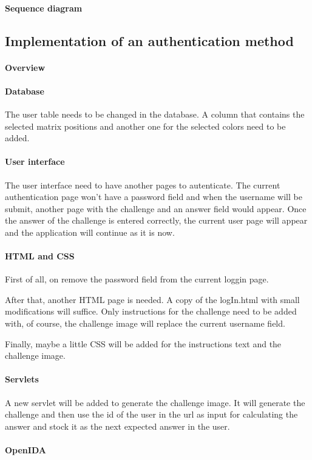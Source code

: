 \documentclass[11pt,a4paper]{article}
\begin{document}
\paragraph{Sequence diagram}

\subsection*{Implementation of an authentication method}
\paragraph{Overview}

\paragraph{Database}
The user table needs to be changed in the database. A column that contains the selected matrix positions and another
one for the selected colors need to be added.

\paragraph{User interface}
The user interface need to have another pages to autenticate. The current authentication page won't have a password
field and when the username will be submit, another page with the challenge and an answer field would appear. Once the
answer of the challenge is entered correctly, the current user page will appear and the application will continue as it
is now.

\paragraph{HTML and CSS}
First of all, on remove the password field from the current loggin page.

After that, another HTML page is needed. A copy of the logIn.html with small modifications will suffice. Only
instructions for the challenge need to be added with, of course, the challenge image will replace the current username
field.

Finally, maybe a little CSS will be added for the instructions text and the challenge image.

\paragraph{Servlets}
A new servlet will be added to generate the challenge image. It will generate the challenge and then use the id of the user in the url as input for
calculating the answer and stock it as the next expected answer in the user.

\paragraph{OpenIDA}
\end{document}
